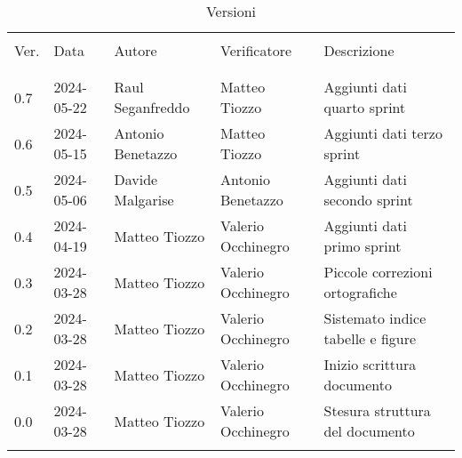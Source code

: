 \documentclass[12pt]{article} %
\begin{document}


\newpage



\begin{table}[!h]
	\footnotesize
	\begin{center}
		\caption*{Versioni}
		\vspace{0.5cm}
		\begin{tabular}{ l l l l p{6cm} }
			\hline                                                                                          \\[-2ex]
			Ver. & Data       & Autore             & Verificatore       & Descrizione                       \\
			\\[-2ex] \hline \\[-1.5ex]
			0.7  & 2024-05-22 & Raul Seganfreddo   & Matteo Tiozzo		& Aggiunti dati quarto sprint       \\
			0.6  & 2024-05-15 & Antonio Benetazzo  & Matteo Tiozzo      & Aggiunti dati terzo sprint        \\
			0.5  & 2024-05-06 & Davide Malgarise   & Antonio Benetazzo  & Aggiunti dati secondo sprint      \\
			0.4  & 2024-04-19 & Matteo Tiozzo      & Valerio Occhinegro & Aggiunti dati primo sprint        \\
			0.3  & 2024-03-28 & Matteo Tiozzo      & Valerio Occhinegro & Piccole correzioni ortografiche   \\
			0.2  & 2024-03-28 & Matteo Tiozzo      & Valerio Occhinegro & Sistemato indice tabelle e figure \\
			0.1  & 2024-03-28 & Matteo Tiozzo      & Valerio Occhinegro & Inizio scrittura documento        \\
			0.0  & 2024-03-28 & Matteo Tiozzo      & Valerio Occhinegro & Stesura struttura del documento   \\
			\\[-1.5ex] \hline
		\end{tabular}
	\end{center}
\end{table}

\newpage

\tableofcontents

\newpage

\listoftables

\listoffigures

\newpage



\newpage



\newpage



\newpage



\newpage


\end{document}
